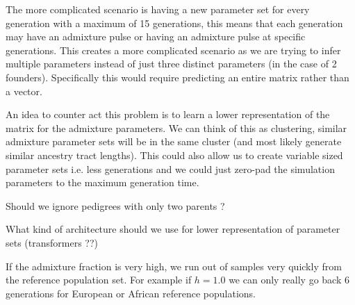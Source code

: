 \documentclass[./main.tex]{subfiles}
\begin{document}
The more complicated scenario is having a new parameter set for every generation with a maximum of 15 generations, this means that each generation may have an admixture pulse or having an admixture pulse at specific generations.  This creates a more complicated scenario as we are trying to infer multiple parameters instead of just three distinct parameters (in the case of 2 founders).  Specifically this would require predicting an entire matrix rather than a vector.  

An idea to counter act this problem is to learn a lower representation of the matrix for the admixture parameters.  We can think of this as clustering, similar admixture parameter sets will be in the same cluster (and most likely generate similar ancestry tract lengths).  This could also allow us to create variable sized parameter sets i.e. less generations and we could just zero-pad the simulation parameters to the maximum generation time.  

Should we ignore pedigrees with only two parents ? 

What kind of architecture should we use for lower representation of parameter sets (transformers ??)

If the admixture fraction is very high, we run out of samples very quickly from the reference population set.  For example if $h=1.0$ we can only really go back 6 generations for European or African reference populations.  
\end{document}

